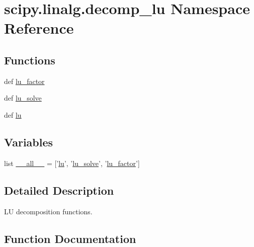 \hypertarget{namespacescipy_1_1linalg_1_1decomp__lu}{}\section{scipy.\+linalg.\+decomp\+\_\+lu Namespace Reference}
\label{namespacescipy_1_1linalg_1_1decomp__lu}
\subsection*{Functions}
\begin{DoxyCompactItemize}
\item 
def \hyperlink{namespacescipy_1_1linalg_1_1decomp__lu_afc213c8435456c90ba27bda0b1db20f4}{lu\+\_\+factor}
\item 
def \hyperlink{namespacescipy_1_1linalg_1_1decomp__lu_ac9a5c9b939bdf4283dcfbeba0b9aa0d5}{lu\+\_\+solve}
\item 
def \hyperlink{namespacescipy_1_1linalg_1_1decomp__lu_a01c528deaae79afb2a800b91f8da9a45}{lu}
\end{DoxyCompactItemize}
\subsection*{Variables}
\begin{DoxyCompactItemize}
\item 
list \hyperlink{namespacescipy_1_1linalg_1_1decomp__lu_a03330e72df07fe58c89c53c9205ee9d8}{\+\_\+\+\_\+all\+\_\+\+\_\+} = \mbox{[}'\hyperlink{namespacescipy_1_1linalg_1_1decomp__lu_a01c528deaae79afb2a800b91f8da9a45}{lu}', '\hyperlink{namespacescipy_1_1linalg_1_1decomp__lu_ac9a5c9b939bdf4283dcfbeba0b9aa0d5}{lu\+\_\+solve}', '\hyperlink{namespacescipy_1_1linalg_1_1decomp__lu_afc213c8435456c90ba27bda0b1db20f4}{lu\+\_\+factor}'\mbox{]}
\end{DoxyCompactItemize}


\subsection{Detailed Description}
\begin{DoxyVerb}LU decomposition functions.\end{DoxyVerb}
 

\subsection{Function Documentation}
\hypertarget{namespacescipy_1_1linalg_1_1decomp__lu_a01c528deaae79afb2a800b91f8da9a45}{}
